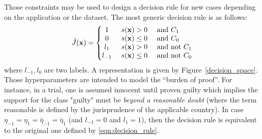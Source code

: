 \documentclass[preprint,12pt]{elsarticle}
\theoremstyle{definition}
\begin{document}
Those constraints may be used to design a decision rule for new cases depending on the application or the dataset. The most generic decision rule is as follows:
\begin{align}
\label{eqn:decision_rule_revised}
   \tilde J(\mathbf x) =  \left\{\begin{matrix}
  1 & ~ s(\mathbf  x) > 0 & \text{ and } C_1 \hfill\\ 
  0 & ~  s(\mathbf  x) \leq 0 &\text{ and } C_0 \hfill\\
  l_1 & ~ s(\mathbf  x) > 0 & \text{ and not } C_1 \hfill\\ 
  l_{-1} & ~  s(\mathbf  x) \leq 0 & \text{ and not } C_0 \hfill
  \end{matrix}\right.
  \end{align} where $l_{-1}, l_0$ are two labels. A representation is given by Figure~\ref{decision_space}.
Those hyperparameters are intended to model the ``burden of proof''. For instance, in a trial, one is assumed innocent until proven guilty which implies the support for the class "guilty" must be {\it beyond a reasonable doubt} (where the term reasonable is defined by the jurisprudence of the applicable country). In case $\eta_{-1} = \eta_1 = \bar \eta_{-1} = \bar \eta_1$ (and $l_{-1} = 0$ and $l_1 = 1$), then the decision rule is equivalent to the original one defined by \eqref{eqn:decision_rule}.
\end{document}
